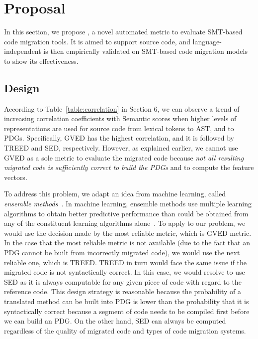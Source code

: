 \section{Proposal}

In this section, we propose {\model}, a novel automated metric to
evaluate SMT-based code migration tools. It is aimed to support source
code, and language-independent
{\model} is then empirically validated on SMT-based code migration
models to show its effectiveness. 


\subsection{Design}

According to Table~\ref{table:correlation} in Section 6, we can
observe a trend of increasing correlation coefficients with Semantic
scores when higher levels of representations are used for source code
from lexical tokens to AST, and to PDGs.
%
Specifically, GVED has the highest correlation, and it is followed by
TREED and SED, respectively. 
However, as explained earlier, we cannot use GVED as a sole metric to
evaluate the migrated code because {\em not all resulting migrated
  code is sufficiently correct to build the PDGs} and to compute
the feature vectors. 

To address this problem, we adapt an idea from machine learning,
called {\em ensemble methods}~\cite{ensemble}. In machine learning,
ensemble methods use multiple learning algorithms to obtain better
predictive performance than could be obtained from any of the
constituent learning algorithms alone~\cite{ensemble}.
To apply to our problem, we would use the decision made by the most
reliable metric, which is GVED metric. In the case that the most
reliable metric is not available (due to the fact that an PDG cannot
be built from incorrectly migrated code), we would use the next
reliable one, which is TREED. TREED in turn would face the same issue
if the migrated code is not syntactically correct. In this case, we
would resolve to use SED as it is always computable for any given
piece of code with regard to the reference code. This design strategy
is reasonable because the probability of a translated method can be
built into PDG is lower than the probability that it is syntactically
correct because a segment of code needs to be compiled first before we
can build an PDG. On the other hand, SED can always be computed
regardless of the quality of migrated code and types of code migration
systems.

